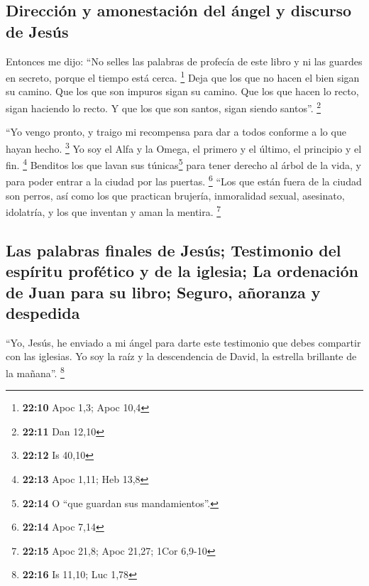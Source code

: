 \hypertarget{direcciuxf3n-y-amonestaciuxf3n-del-uxe1ngel-y-discurso-de-jesuxfas}{%
\subsection{Dirección y amonestación del ángel y discurso de
Jesús}\label{direcciuxf3n-y-amonestaciuxf3n-del-uxe1ngel-y-discurso-de-jesuxfas}}

 Entonces me dijo: ``No selles las palabras de profecía
de este libro y ni las guardes en secreto, porque el tiempo está cerca.
\footnote{\textbf{22:10} Apoc 1,3; Apoc 10,4}  Deja que
los que no hacen el bien sigan su camino. Que los que son impuros sigan
su camino. Que los que hacen lo recto, sigan haciendo lo recto. Y que
los que son santos, sigan siendo santos''. \footnote{\textbf{22:11} Dan
  12,10}

 ``Yo vengo pronto, y traigo mi recompensa para dar a
todos conforme a lo que hayan hecho. \footnote{\textbf{22:12} Is 40,10}
 Yo soy el Alfa y la Omega, el primero y el último, el
principio y el fin. \footnote{\textbf{22:13} Apoc 1,11; Heb 13,8}
 Benditos los que lavan sus túnicas\footnote{\textbf{22:14}
  O ``que guardan sus mandamientos''.} para tener derecho al árbol de la
vida, y para poder entrar a la ciudad por las puertas. \footnote{\textbf{22:14}
  Apoc 7,14}  ``Los que están fuera de la ciudad son
perros, así como los que practican brujería, inmoralidad sexual,
asesinato, idolatría, y los que inventan y aman la mentira. \footnote{\textbf{22:15}
  Apoc 21,8; Apoc 21,27; 1Cor 6,9-10}

\hypertarget{las-palabras-finales-de-jesuxfas-testimonio-del-espuxedritu-profuxe9tico-y-de-la-iglesia-la-ordenaciuxf3n-de-juan-para-su-libro-seguro-auxf1oranza-y-despedida}{%
\subsection{Las palabras finales de Jesús; Testimonio del espíritu
profético y de la iglesia; La ordenación de Juan para su libro; Seguro,
añoranza y
despedida}\label{las-palabras-finales-de-jesuxfas-testimonio-del-espuxedritu-profuxe9tico-y-de-la-iglesia-la-ordenaciuxf3n-de-juan-para-su-libro-seguro-auxf1oranza-y-despedida}}

 ``Yo, Jesús, he enviado a mi ángel para darte este
testimonio que debes compartir con las iglesias. Yo soy la raíz y la
descendencia de David, la estrella brillante de la mañana''. \footnote{\textbf{22:16}
  Is 11,10; Luc 1,78}

